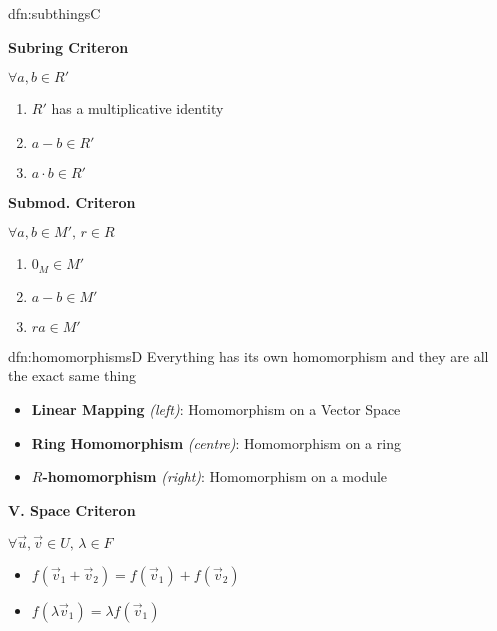 \documentclass[landscape, 8pt]{extarticle}
\begin{document}
\begin{multicols}{3}
\begin{dfn}{dfn:subthings}{C}
\begin{multicols}{3}
        \textbf{Subring Criteron}

        $\forall a, b\in R'$
        \begin{enumerate}[leftmargin=*]
            \item $R'$ has a multiplicative identity
            \item $a - b \in R'$
            \item $a \cdot b\in R'$
        \end{enumerate}

        \columnbreak

        \textbf{Submod. Criteron}

        $\forall a, b\in M',\,r\in R$
        \begin{enumerate}[leftmargin=*]
            \item $0_{M}\in M'$
            \item $a - b \in M'$
            \item $ra\in M'$
        \end{enumerate}
    \end{multicols}
    \setlength{\columnseprule}{0pt}
\end{dfn}






\begin{dfn}{dfn:homomorphisms}{D}
    Everything has its own homomorphism and they are all the exact same thing
    \begin{itemize}
        \setlength\itemsep{0em}
        \item \textbf{Linear Mapping} \textit{(left)}: Homomorphism on a Vector Space
        \item \textbf{Ring Homomorphism} \textit{(centre)}: Homomorphism on a ring
        \item \textbf{$R$-homomorphism} \textit{(right)}: Homomorphism on a module
    \end{itemize}

    \setlength{\columnseprule}{0.5pt}
    \begin{multicols}{3}
        \textbf{V. Space Criteron}

        $\forall\vec{u}, \vec{v}\in U,\,\lambda\in F$
        \begin{itemize}[leftmargin=*]
            \item $f(\vec{v}_{1} + \vec{v}_{2}) = f(\vec{v}_{1}) + f(\vec{v}_{2})$
            \item $f(\lambda \vec{v}_{1}) = \lambda f(\vec{v}_{1})$
        \end{itemize}
        

\end{multicols}
\end{dfn}
\end{multicols}
\end{document}
